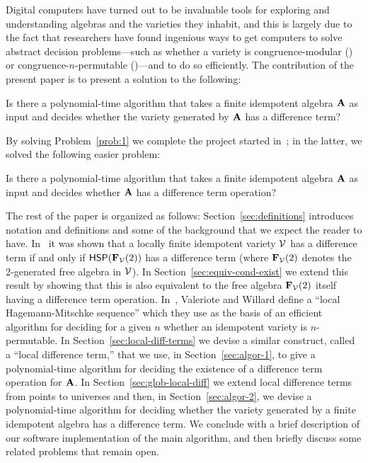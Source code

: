 Digital computers have turned out to be invaluable tools for exploring and
understanding algebras and the varieties they inhabit, and this is largely due
to the fact that researchers have found ingenious ways
to get computers to solve abstract decision problems---such as
whether a variety is 
congruence-modular (\cite{Freese:2009}) or
congruence-$n$-permutable (\cite{MR3239624})---and to do so efficiently.
The contribution of the present paper is to present a solution to the following:
\begin{prob}
  \label{prob:1}
  Is there a polynomial-time algorithm that takes a finite
  idempotent algebra $\mathbf{A}$ as input and decides whether the variety generated by
  $\mathbf{A}$ has a difference term?
\end{prob}
By solving Problem~\ref{prob:1} we complete the project started
in~\cite{DeMeo:2017}; in the latter, we solved the following easier problem:
\begin{prob}
  \label{prob:2}
  Is there a polynomial-time algorithm that takes a finite
  idempotent algebra $\mathbf{A}$ as input and decides whether 
  $\mathbf{A}$ has a difference term operation?
\end{prob}

The rest of the paper is organized as follows:
Section~\ref{sec:definitions} introduces notation and definitions and some of
the background that we expect the reader to have.
In~\cite{MR1358491} 
it was shown that a locally finite idempotent variety $\mathcal{V}$ has a difference
term if and only if $\mathsf{H} \mathsf{S} \mathsf{P}(\mathbf{F}_{\mathcal{V}}(2))$ 
has a difference term (where $\mathbf{F}_{\mathcal{V}}(2)$ denotes the 2-generated free algebra in $\mathcal{V}$).
In Section~\ref{sec:equiv-cond-exist}
we extend this result by showing that this is also equivalent to
the free algebra $\mathbf{F}_{\mathcal{V}}(2)$ itself having a difference term operation.
In~\cite{MR3239624},
Valeriote and Willard define 
a ``local Hagemann-Mitschke sequence'' which they use as the basis of
an efficient algorithm for deciding for a given $n$ whether an idempotent
variety is $n$-permutable. 
In Section~\ref{sec:local-diff-terms}
we devise a similar construct, called
a ``local difference term,'' that we use, in Section~\ref{sec:algor-1},
to give a polynomial-time algorithm for deciding the existence of a difference term
operation for $\mathbf{A}$.  In Section~\ref{sec:glob-local-diff} we extend local
difference terms from points to universes and then, in 
Section~\ref{sec:algor-2}, we devise a polynomial-time algorithm for
deciding whether the variety generated by a finite idempotent algebra has a
difference term. We conclude with a brief description of our software
implementation of the main algorithm, and then briefly discuss some related 
problems that remain open.


